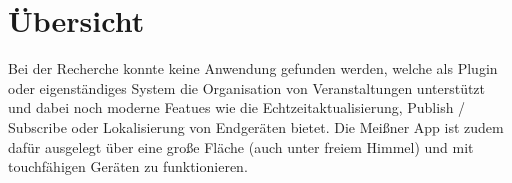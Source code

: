 
\section{Übersicht}
Bei der Recherche konnte keine Anwendung gefunden werden, welche als Plugin oder eigenständiges System die Organisation von Veranstaltungen unterstützt und dabei noch moderne Featues wie die Echtzeitaktualisierung, Publish / Subscribe oder Lokalisierung von Endgeräten bietet. Die Meißner App ist zudem dafür ausgelegt über eine große Fläche (auch unter freiem Himmel) und mit touchfähigen Geräten zu funktionieren. 